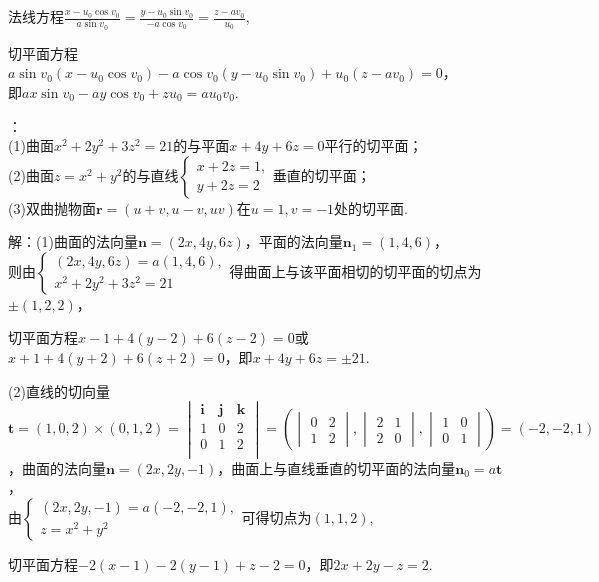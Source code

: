 \documentclass[12pt,UTF8]{ctexart}
\begin{document}
\begin{enumerate}
法线方程$\frac{x-u_0\cos v_0}{a\sin v_0}=\frac{y-u_0\sin v_0}{-a\cos v_0}=\frac{z-av_0}{u_0}$,

切平面方程$a\sin v_0(x-u_0\cos v_0)-a\cos v_0(y-u_0\sin v_0)+u_0(z-av_0)=0$，\\
即$ax\sin v_0-ay\cos v_0+zu_0=au_0v_0$.

：\\
(1)曲面$x^2+2y^2+3z^2=21$的与平面$x+4y+6z=0$平行的切平面；\\
(2)曲面$z=x^2+y^2$的与直线$\begin{cases}
x+2z=1,\\
y+2z=2
\end{cases}$垂直的切平面；\\
(3)双曲抛物面$\bm r=(u+v,u-v,uv)$在$u=1,v=-1$处的切平面.

解：(1)曲面的法向量$\bm n=(2x,4y,6z)$，平面的法向量$\bm n_1=(1,4,6)$，\\则由$\begin{cases}(2x,4y,6z)=a(1,4,6),\\
x^2+2y^2+3z^2=21
\end{cases}$得曲面上与该平面相切的切平面的切点为$\pm(1,2,2)$，

切平面方程$x-1+4(y-2)+6(z-2)=0$或$x+1+4(y+2)+6(z+2)=0$，即$x+4y+6z=\pm21$.

(2)直线的切向量$\bm t=(1,0,2)\times(0,1,2)=\begin{vmatrix}
\bm i&\bm j&\bm k\\
1&0&2\\
0&1&2\\
\end{vmatrix}=(\begin{vmatrix}
0&2\\
1&2
\end{vmatrix},\begin{vmatrix}
2&1\\
2&0
\end{vmatrix},\begin{vmatrix}
1&0\\
0&1
\end{vmatrix})=(-2,-2,1)$，曲面的法向量$\bm n=(2x,2y,-1)$，曲面上与直线垂直的切平面的法向量$\bm n_0=a\bm t$，\\
由$\begin{cases}
(2x,2y,-1)=a(-2,-2,1),\\
z=x^2+y^2
\end{cases}$可得切点为$(1,1,2)$,

切平面方程$-2(x-1)-2(y-1)+z-2=0$，即$2x+2y-z=2$.


\end{enumerate}
\end{document}
